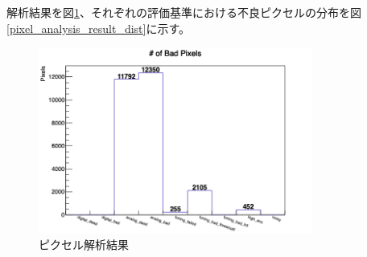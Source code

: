 解析結果を図\ref{pixel_analysis_result}、それぞれの評価基準における不良ピクセルの分布を図\ref{pixel_analysis_result_dist}に示す。
\begin{figure}[bpt]\centering
\includegraphics[width=9cm]{./data/analysis_result/Bad_Pixels.png}
\caption[ピクセル解析結果]{ピクセル解析結果}
\label{pixel_analysis_result}
\end{figure}
